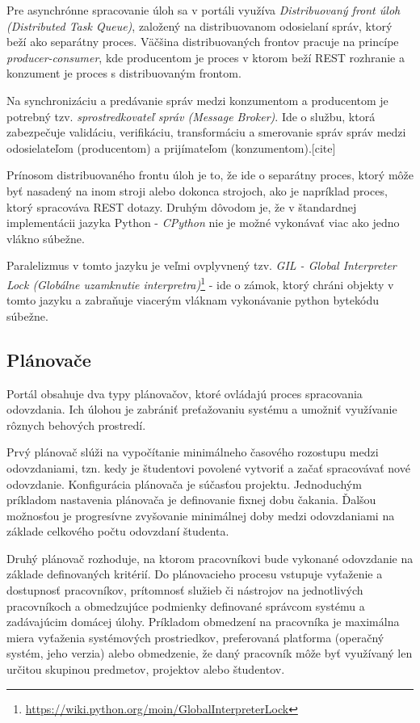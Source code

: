 \documentclass[
  digital, %
  twoside, %
  table,   %
  lof,     %
  lot,     %
]{fithesis3}
\begin{document}
Pre asynchrónne spracovanie úloh sa v portáli využíva \emph{Distribuovaný front úloh (Distributed Task Queue)}, založený na distribuovanom odosielaní správ, ktorý beží ako separátny proces. Väčšina distribuovaných frontov pracuje na princípe \emph{producer-consumer}, kde producentom je proces v ktorom beží REST rozhranie a konzument je proces s distribuovaným frontom. 

Na synchronizáciu a predávanie správ medzi konzumentom a producentom je potrebný tzv. \emph{sprostredkovateľ správ (Message Broker)}. Ide o službu, ktorá zabezpečuje validáciu, verifikáciu, transformáciu a smerovanie správ správ medzi odosielateľom (producentom) a prijímateľom (konzumentom).[cite]

Prínosom distribuovaného frontu úloh je to, že ide o separátny proces, ktorý môže byť nasadený na inom stroji alebo dokonca strojoch, ako je napríklad proces, ktorý spracováva REST dotazy. Druhým dôvodom je, že v štandardnej implementácii jazyka Python - \emph{CPython} nie je možné vykonávať viac ako jedno vlákno súbežne.

Paralelizmus v tomto jazyku je veľmi ovplyvnený tzv. \emph{GIL - Global Interpreter Lock (Globálne uzamknutie interpretra)}\footnote{\url{https://wiki.python.org/moin/GlobalInterpreterLock}} - ide o zámok, ktorý chráni objekty v tomto jazyku a zabraňuje viacerým vláknam vykonávanie python bytekódu súbežne.

\subsection{Plánovače}

Portál obsahuje dva typy plánovačov, ktoré ovládajú proces spracovania odovzdania. Ich úlohou je zabrániť preťažovaniu systému a umožniť využívanie rôznych behových prostredí.

Prvý plánovač slúži na vypočítanie minimálneho časového rozostupu medzi odovzdaniami, tzn. kedy je študentovi povolené vytvoriť a začať spracovávať nové odovzdanie. Konfigurácia plánovača je súčasťou projektu. Jednoduchým príkladom nastavenia plánovača je definovanie fixnej dobu čakania. Ďalšou možnosťou je progresívne zvyšovanie minimálnej doby medzi odovzdaniami na základe celkového počtu odovzdaní študenta.

Druhý plánovač rozhoduje, na ktorom pracovníkovi bude vykonané odovzdanie na základe definovaných kritérií. Do plánovacieho procesu vstupuje vyťaženie a dostupnosť pracovníkov, prítomnosť služieb či nástrojov na jednotlivých pracovníkoch a obmedzujúce podmienky definované správcom systému a zadávajúcim domácej úlohy. Príkladom obmedzení na pracovníka je maximálna miera vyťaženia systémových prostriedkov, preferovaná platforma (operačný systém, jeho verzia) alebo obmedzenie, že daný pracovník môže byť využívaný len určitou skupinou predmetov, projektov alebo študentov. 
\end{document}
